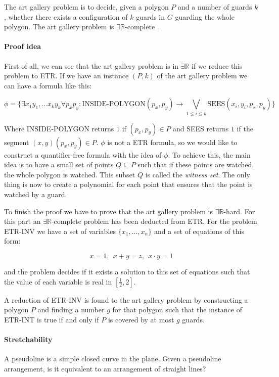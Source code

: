 The art gallery problem is to decide, given a polygon $P$ and a number of
guards $k$, whether there exists a configuration of $k$ guards in $G$
guarding the whole polygon. The art gallery problem is $\exists
\mathbb{R}$-complete \cite{abrahamsenArtGalleryProblem2017}.

\paragraph{Proof idea} First of all, we can see that the art gallery problem
is in $\exists \mathbb{R}$ if we reduce this problem to ETR. If we have an
instance $(P,k)$ of the art gallery problem we can have a formula
\cite{EFRAT2006238} like this:

$$\phi = \{\exists x_1y_1,\dots x_ky_k \forall p_xp_y :
\text{INSIDE-POLYGON}(p_x,p_y) \to \bigvee_{1 \leq i \leq k}
\text{SEES}(x_i,y_i,p_x,p_y)\}$$

Where INSIDE-POLYGON returns $1$ if $(p_x,p_y) \in P$ and SEES returns $1$ if
the segment $(x,y)(p_x,p_y) \in P$. $\phi$ is not a ETR formula, so we would like
to construct a quantifier-free formula with the idea of $\phi$. To achieve this,
the main idea is to have a small set of points $Q \subseteq P$ such that if these
points are watched, the whole polygon is watched. This subset $Q$ is called
the \textit{witness set}. The only thing is now to create a polynomial for each
point that ensures that the point is watched by a guard.

To finish the proof we have to prove that the art gallery problem is $\exists
\mathbb{R}$-hard. For this part an $\exists \mathbb{R}$-complete
problem has been deducted from ETR. For the problem ETR-INV we have a set of
variables $\{x_1,\dots,x_n\}$ and a set of equations of this form:

$$x = 1,\ \ x + y = z,\ \ x \cdot y = 1 $$

and the problem decides if it exists a solution to this set of equations such
that the value of each variable is real in $[\frac{1}{2},2]$.

A reduction of ETR-INV is found to the art gallery problem by constructing
a polygon $P$ and finding a number $g$ for that polygon such that the instance
of ETR-INT is true if and only if $P$ is covered by at most $g$ guards.

\paragraph{Stretchability} A pseudoline is a simple closed curve in the plane.
Given a pseudoline arrangement, is it equivalent to an arrangement of straight lines?

